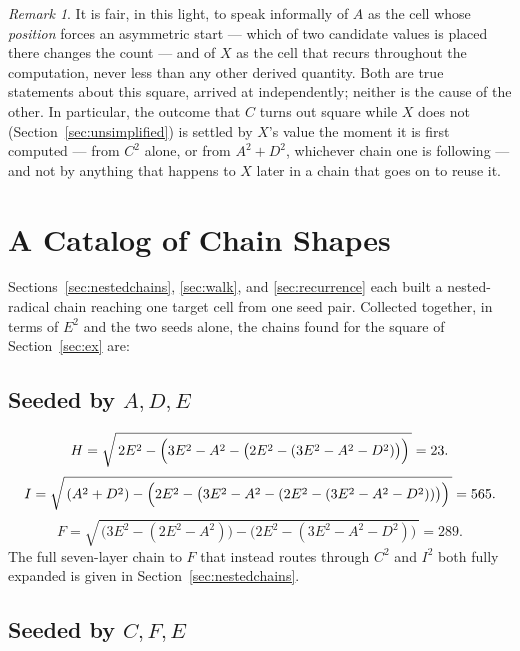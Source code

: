 \documentclass[12pt]{article}
\theoremstyle{remark}
\newtheorem{remark}[theorem]{Remark}
\begin{document}
\begin{remark}
It is fair, in this light, to speak informally of $A$ as the cell whose
\emph{position} forces an asymmetric start --- which of two candidate
values is placed there changes the count --- and of $X$ as the cell
that recurs throughout the computation, never less than any other
derived quantity. Both are true statements about this square, arrived
at independently; neither is the cause of the other. In particular,
the outcome that $C$ turns out square while $X$ does not
(Section~\ref{sec:unsimplified}) is settled by $X$'s value the moment
it is first computed --- from $C^2$ alone, or from $A^2+D^2$, whichever
chain one is following --- and not by anything that happens to $X$
later in a chain that goes on to reuse it.
\end{remark}

\section{A Catalog of Chain Shapes}\label{sec:catalog}

Sections~\ref{sec:nestedchains}, \ref{sec:walk}, and \ref{sec:recurrence}
each built a nested-radical chain reaching one target cell from one
seed pair. Collected together, in terms of $E^2$ and the two seeds
alone, the chains found for the square of Section~\ref{sec:ex} are:

\subsection*{Seeded by $A, D, E$}

\[
H = \sqrt{\,2E^2 - \Bigl(3E^2-A^2-\bigl(2E^2-(3E^2-A^2-D^2)\bigr)\Bigr)\,}
  = 23 .
\]
\[
I = \sqrt{\,(A^2+D^2) - \Bigl(2E^2 - \bigl(3E^2-A^2-(2E^2-(3E^2-A^2-D^2))\bigr)\Bigr)\,}
  = 565 .
\]
\[
F = \sqrt{\,\bigl(3E^2-(2E^2-A^2)\bigr) - \bigl(2E^2-(3E^2-A^2-D^2)\bigr)\,}
  = 289 .
\]
The full seven-layer chain to $F$ that instead routes through $C^2$
and $I^2$ both fully expanded is given in
Section~\ref{sec:nestedchains}.

\subsection*{Seeded by $C, F, E$}
\end{document}
